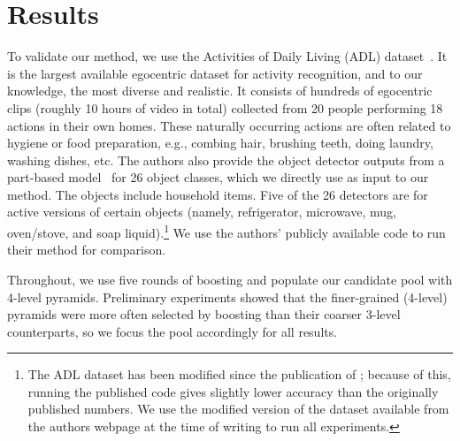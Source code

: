 \vspace*{-0.2in}
\section{Results}

To validate our method, we use the Activities of Daily Living (ADL) dataset~\cite{Ramanan12}.  It is the largest available egocentric dataset for activity recognition, and to our knowledge, the most diverse and realistic.  It consists of hundreds of egocentric clips	(roughly 10 hours of video in total) collected from 20 people performing 18 actions in their own homes. These naturally
  occurring  actions are often related to hygiene or food preparation, e.g., combing hair, brushing teeth, doing laundry, washing dishes, etc. The authors also provide the object detector outputs from a part-based model~\cite{DPM} for 26 object classes, which we directly use as input to our method.  The objects include household items.  Five of the 26 detectors are for active versions of certain objects (namely, refrigerator, microwave, mug, oven/stove, and soap liquid).\footnote{The ADL dataset has been modified since the publication of
	\cite{Ramanan12}; because of this, running the published code gives
	slightly lower accuracy than the originally published numbers. We use the
  modified version of the dataset available from the authors webpage at the time of writing to
run all experiments.}  We use the authors' publicly available code to run their method for comparison.   
  
  
Throughout, we use five rounds of boosting and populate our candidate pool with 4-level pyramids.  Preliminary experiments showed that the finer-grained (4-level) pyramids were more often selected by boosting than their coarser 3-level counterparts, so we focus the pool accordingly for all results.  


%


